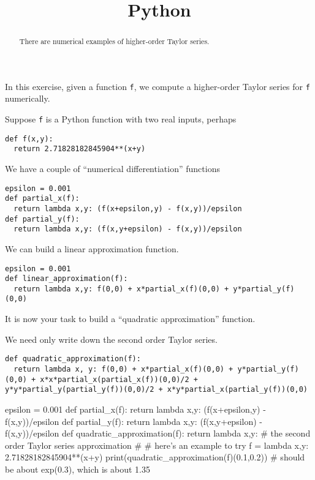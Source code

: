 \documentclass{ximera}
\title{Python}
\begin{document}
\begin{abstract}
  There are numerical examples of higher-order Taylor series.
\end{abstract}\maketitle

In this exercise, given a function \verb|f|, we compute a higher-order
Taylor series for \verb|f| numerically.

\begin{question}
  Suppose \verb|f| is a Python function with two real inputs, perhaps
\begin{verbatim}
def f(x,y):
  return 2.71828182845904**(x+y)
\end{verbatim}
We have a couple of ``numerical differentiation'' functions
\begin{verbatim}
epsilon = 0.001
def partial_x(f):
  return lambda x,y: (f(x+epsilon,y) - f(x,y))/epsilon
def partial_y(f):
  return lambda x,y: (f(x,y+epsilon) - f(x,y))/epsilon
\end{verbatim}
We can build a linear approximation function.
\begin{verbatim}
epsilon = 0.001
def linear_approximation(f):
  return lambda x,y: f(0,0) + x*partial_x(f)(0,0) + y*partial_y(f)(0,0) 
\end{verbatim}
It is now your task to build a ``quadratic approximation'' function.

  \begin{solution}
    \begin{hint}
We need only write down the second order Taylor series.
\begin{verbatim}
def quadratic_approximation(f):
  return lambda x, y: f(0,0) + x*partial_x(f)(0,0) + y*partial_y(f)(0,0) + x*x*partial_x(partial_x(f))(0,0)/2 + y*y*partial_y(partial_y(f))(0,0)/2 + x*y*partial_x(partial_y(f))(0,0)
\end{verbatim}
    \end{hint}
    \begin{python}
epsilon = 0.001
def partial_x(f):
  return lambda x,y: (f(x+epsilon,y) - f(x,y))/epsilon
def partial_y(f):
  return lambda x,y: (f(x,y+epsilon) - f(x,y))/epsilon
def quadratic_approximation(f):
  return lambda x,y: # the second order Taylor series approximation
#
# here's an example to try
f = lambda x,y: 2.71828182845904**(x+y)
print(quadratic_approximation(f)(0.1,0.2)) # should be about exp(0.3), which is about 1.35


\end{python}
\end{solution}
\end{question}
\end{document}
